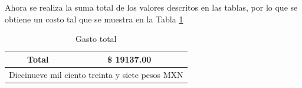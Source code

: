 Ahora se realiza la suma total de los valores descritos en las tablas, por lo que se obtiene un costo tal que se muestra en la Tabla \ref{tab:gastototal}

\begin{table}[h]
        \begin{center}
            \caption{Gasto total}
            \begin{tabular}{ | c | c |}
               \hline
                Total & \$ 19137.00 \\ \hline
                \multicolumn{2}{|c|}{Diecinueve mil ciento treinta y siete pesos MXN}\\ \hline
            \end{tabular}
            \label{tab:gastototal}
        \end{center}
    \end{table}
  

